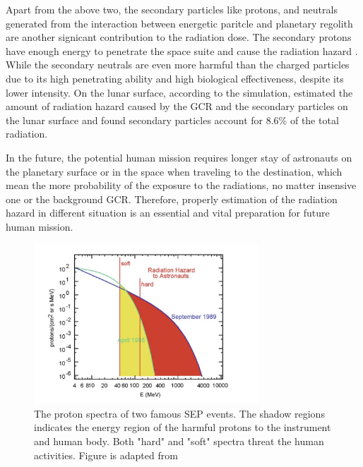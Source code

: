 Apart from the above two, the secondary particles like protons, and neutrals generated from the interaction between energetic paritcle and planetary regolith are another signicant contribution to the radiation dose. The secondary protons have enough energy to penetrate the space suite and cause the radiation hazard \citep{Xu2022FrASS}. While the secondary neutrals are even more harmful than the charged particles due to its high penetrating ability and high biological effectiveness, despite its lower intensity.
On the lunar surface, according to the simulation, \citet{Spence2013} estimated the amount of radiation hazard caused by the \ac{GCR} and the secondary particles on the lunar surface and found secondary particles account for 8.6\% of the total radiation.

In the future, the potential human mission requires longer stay of astronauts on the planetary surface or in the space when traveling to the destination, which mean the more probability of the exposure to the radiations, no matter insensive one or the background GCR. Therefore, properly estimation of the radiation hazard in different situation is an essential and vital preparation for future human mission.









\begin{figure}
	\centering
	\includegraphics[width = 0.75\textwidth]{images/SEP-radiation_hazard.png}
	\caption[The proton spectra in two SEP events indicating the possible radiation energy]{The proton spectra of two famous SEP events. The shadow regions indicates the energy region of the harmful protons to the instrument and human body. Both "hard" and "soft" spectra threat the human activities. Figure is adapted from \citep{Reames2021LNP}}
	\label{Fig:SEP-radiation_hazard}
\end{figure}



